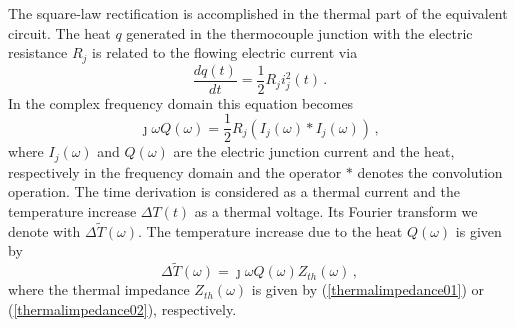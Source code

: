 \documentclass[journal]{IEEEtran}
\begin{document}
The square-law rectification is accomplished in the thermal part of the equivalent circuit. The heat $q$ generated in the thermocouple junction with the electric resistance $R_j$ is related to the flowing electric current via
%
\begin{equation}	\label{eqdet060}
	\frac{dq(t)}{dt} = \frac{1}{2} R_j i_j^2(t)\, .
\end{equation}
%
In the complex frequency domain this equation becomes
%
\begin{equation}	\label{eqdet070}
	\jmath \omega Q (\omega) = \frac{1}{2} R_j \left(I_j(\omega) \ast I_j(\omega) \right) \, ,
\end{equation}
%
where $I_j(\omega)$ and $Q(\omega)$ are the electric junction current and the heat, respectively in the frequency domain and the operator $\ast$ denotes the convolution operation.
The time derivation is considered as a thermal current and the temperature increase $\Delta T(t)$ as a thermal voltage. Its Fourier transform we denote with $\Delta \tilde{T}(\omega)$. The temperature increase due to the heat $Q (\omega)$ is given by
%
\begin{equation}	\label{eqdet080}
	\Delta \tilde{T}(\omega) = \jmath \omega Q (\omega) Z_{th}(\omega) \, ,
\end{equation}
%
where the thermal impedance  $Z_{th}(\omega)$ is given by (\ref{thermalimpedance01}) or  (\ref{thermalimpedance02}), respectively.
\end{document}
